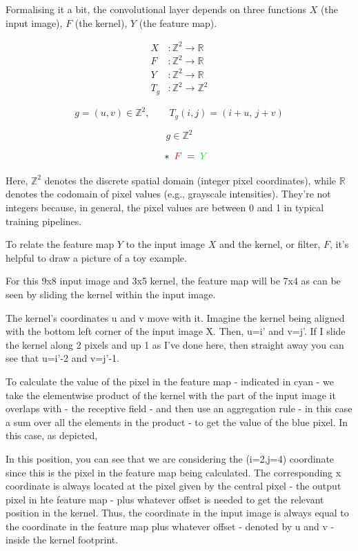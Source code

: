 \documentclass[12pt]{article}
\begin{document}
Formalising it a bit, the convolutional layer depends on three functions $X$ (the input image), $F$ (the kernel), $Y$ (the feature map).

\begin{equation}
  \label{eq:function-maps}
  \begin{aligned}
      X   &: \mathbb{Z}^2 \rightarrow \mathbb{R} \\
      F   &: \mathbb{Z}^2 \rightarrow \mathbb{R} \\
      Y   &: \mathbb{Z}^2 \rightarrow \mathbb{R} \\
      T_g &: \mathbb{Z}^2 \rightarrow \mathbb{Z}^2
  \end{aligned}
  \end{equation}
  
\[
g = (u,v) \in \mathbb{Z}^2,
\qquad
T_g(i,j) = (i+u,\, j+v)
\]


\[
g \in \mathbb{Z}^2
\]


\[
\textcolor{white}{X}\; *\; \textcolor{red}{F}
\;=\;
\textcolor{green}{Y}
\]



Here, $\mathbb{Z}^2$ denotes the discrete spatial domain (integer pixel coordinates), while $\mathbb{R}$ denotes the codomain of pixel values (e.g., grayscale intensities). They're not integers because, in general, the pixel values are between 0 and 1 in typical training pipelines.

To relate the feature map $Y$ to the input image $X$ and the kernel, or filter, $F$, it's helpful to draw a picture of a toy example. 

For this 9x8 input image and 3x5 kernel, the feature map will be 7x4 as can be seen by sliding the kernel within the input image. 

The kernel's coordinates u and v move with it. Imagine the kernel being aligned with the bottom left corner of the input image X. Then, u=i' and v=j'. If I slide the kernel along 2 pixels and up 1 as I've done here, then straight away you can see that u=i'-2 and v=j'-1.

To calculate the value of the pixel in the feature map - indicated in cyan - we take the elementwise product of the kernel with the part of the input image it overlaps with - the receptive field - and then use an aggregation rule - in this case a sum over all the elements in the product - to get the value of the blue pixel. In this case, as depicted, 

In this position, you can see that we are considering the (i=2,j=4) coordinate since this is the pixel in the feature map being calculated. The corresponding x coordinate is always located at the pixel given by the central pixel - the output pixel in hte feature map - plus whatever offset is needed to get the relevant position in the kernel. Thus, the coordinate in the input image is always equal to the coordinate in the feature map plus whatever offset - denoted by u and v - inside the kernel footprint.
\end{document}
